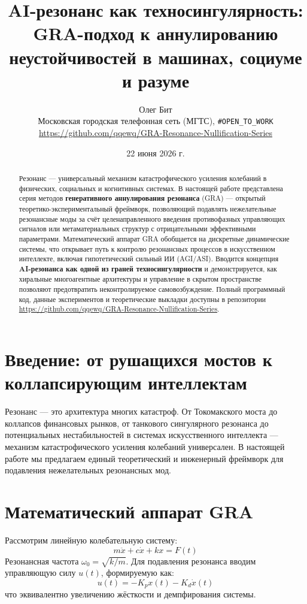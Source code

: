 \documentclass[a4paper,12pt]{article}
\title{\textbf{AI-резонанс как техносингулярность:}\\
GRA-подход к аннулированию неустойчивостей в машинах, социуме и разуме}
\author{Олег Бит\\[2mm]
\small Московская городская телефонная сеть (МГТС), \texttt{\#OPEN\_TO\_WORK}\\[2mm]
\small \url{https://github.com/qqewq/GRA-Resonance-Nullification-Series}}
\date{22 июня 2026 г.}
\begin{document}
\maketitle

\begin{abstract}
Резонанс — универсальный механизм катастрофического усиления колебаний в физических, социальных и когнитивных системах. В настоящей работе представлена серия методов \textbf{генеративного аннулирования резонанса} (GRA) — открытый теоретико-экспериментальный фреймворк, позволяющий подавлять нежелательные резонансные моды за счёт целенаправленного введения противофазных управляющих сигналов или метаматериальных структур с отрицательными эффективными параметрами. Математический аппарат GRA обобщается на дискретные динамические системы, что открывает путь к контролю резонансных процессов в искусственном интеллекте, включая гипотетический сильный ИИ (AGI/ASI). Вводится концепция \textbf{AI-резонанса как одной из граней техносингулярности} и демонстрируется, как хиральные многоагентные архитектуры и управление в скрытом пространстве позволяют предотвратить неконтролируемое самовозбуждение. Полный программный код, данные экспериментов и теоретические выкладки доступны в репозитории \url{https://github.com/qqewq/GRA-Resonance-Nullification-Series}.
\end{abstract}

\section{Введение: от рушащихся мостов к коллапсирующим интеллектам}
Резонанс — это архитектура многих катастроф. От Токомакского моста до коллапсов финансовых рынков, от танкового сингулярного резонанса до потенциальных нестабильностей в системах искусственного интеллекта — механизм катастрофического усиления колебаний универсален. В настоящей работе мы предлагаем единый теоретический и инженерный фреймворк для подавления нежелательных резонансных мод.

\section{Математический аппарат GRA}
Рассмотрим линейную колебательную систему:
\begin{equation}
m\ddot{x} + c\dot{x} + kx = F(t)
\end{equation}
Резонансная частота $\omega_0 = \sqrt{k/m}$. Для подавления резонанса вводим управляющую силу $u(t)$, формируемую как:
\begin{equation}
u(t) = -K_p x(t) - K_d \dot{x}(t)
\end{equation}
что эквивалентно увеличению жёсткости и демпфирования системы.
\end{document}
